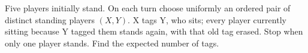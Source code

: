 Five players initially stand. On each turn choose uniformly an ordered pair of distinct standing players $(X,Y)$. X tags Y, who sits; every player currently sitting because Y tagged them stands again, with that old tag erased. Stop when only one player stands. Find the expected number of tags.
